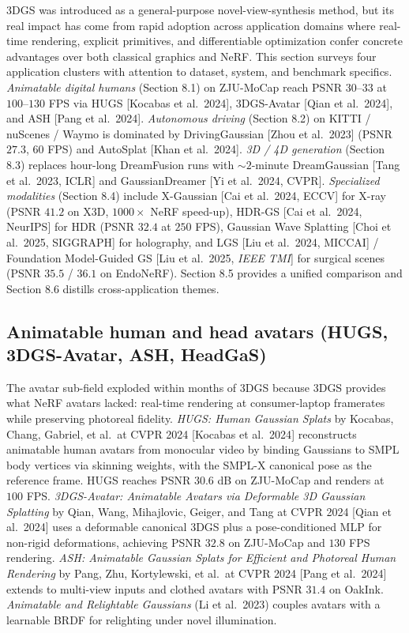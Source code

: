 3DGS was introduced as a general-purpose novel-view-synthesis method, but its real impact has come from rapid adoption across application domains where real-time rendering, explicit primitives, and differentiable optimization confer concrete advantages over both classical graphics and NeRF. This section surveys four application clusters with attention to dataset, system, and benchmark specifics. \emph{Animatable digital humans} (Section 8.1) on ZJU-MoCap reach PSNR \(30\)--\(33\) at \(100\)--\(130\) FPS via HUGS {[}Kocabas et al.~2024{]}, 3DGS-Avatar {[}Qian et al.~2024{]}, and ASH {[}Pang et al.~2024{]}. \emph{Autonomous driving} (Section 8.2) on KITTI / nuScenes / Waymo is dominated by DrivingGaussian {[}Zhou et al.~2023{]} (PSNR \(27.3\), \(60\) FPS) and AutoSplat {[}Khan et al.~2024{]}. \emph{3D / 4D generation} (Section 8.3) replaces hour-long DreamFusion runs with \(\sim\!2\)-minute DreamGaussian {[}Tang et al.~2023, ICLR{]} and GaussianDreamer {[}Yi et al.~2024, CVPR{]}. \emph{Specialized modalities} (Section 8.4) include X-Gaussian {[}Cai et al.~2024, ECCV{]} for X-ray (PSNR \(41.2\) on X3D, \(1000\times\) NeRF speed-up), HDR-GS {[}Cai et al.~2024, NeurIPS{]} for HDR (PSNR \(32.4\) at \(250\) FPS), Gaussian Wave Splatting {[}Choi et al.~2025, SIGGRAPH{]} for holography, and LGS {[}Liu et al.~2024, MICCAI{]} / Foundation Model-Guided GS {[}Liu et al.~2025, \emph{IEEE TMI}{]} for surgical scenes (PSNR \(35.5\) / \(36.1\) on EndoNeRF). Section 8.5 provides a unified comparison and Section 8.6 distills cross-application themes.

\subsection{Animatable human and head avatars (HUGS, 3DGS-Avatar, ASH, HeadGaS)}\label{animatable-human-and-head-avatars-hugs-3dgs-avatar-ash-headgas}

The avatar sub-field exploded within months of 3DGS because 3DGS provides what NeRF avatars lacked: real-time rendering at consumer-laptop framerates while preserving photoreal fidelity. \emph{HUGS: Human Gaussian Splats} by Kocabas, Chang, Gabriel, et al.~at CVPR 2024 {[}Kocabas et al.~2024{]} reconstructs animatable human avatars from monocular video by binding Gaussians to SMPL body vertices via skinning weights, with the SMPL-X canonical pose as the reference frame. HUGS reaches PSNR \(30.6\) dB on ZJU-MoCap and renders at \(100\) FPS. \emph{3DGS-Avatar: Animatable Avatars via Deformable 3D Gaussian Splatting} by Qian, Wang, Mihajlovic, Geiger, and Tang at CVPR 2024 {[}Qian et al.~2024{]} uses a deformable canonical 3DGS plus a pose-conditioned MLP for non-rigid deformations, achieving PSNR \(32.8\) on ZJU-MoCap and \(130\) FPS rendering. \emph{ASH: Animatable Gaussian Splats for Efficient and Photoreal Human Rendering} by Pang, Zhu, Kortylewski, et al.~at CVPR 2024 {[}Pang et al.~2024{]} extends to multi-view inputs and clothed avatars with PSNR \(31.4\) on OakInk. \emph{Animatable and Relightable Gaussians} (Li et al.~2023) couples avatars with a learnable BRDF for relighting under novel illumination.


